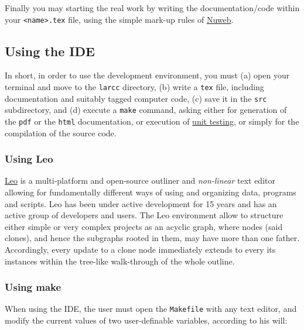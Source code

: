 Finally you may starting the real work by writing the documentation/code within your \texttt{<name>.tex} file, using the simple mark-up rules of \href{run:nuwebdoc.pdf}{Nuweb}.

\subsection{Using the IDE}

In short, in order to use the development environment, you must (a) open your terminal and move to the \texttt{larcc} directory, (b) write a \texttt{tex} file, including documentation and suitably tagged computer code, (c) save it in the \texttt{src} subdirectory, and (d)  execute a \texttt{make} command, asking either for generation of the \texttt{pdf} or the \texttt{html} documentation, or  execution of \href{http://en.wikipedia.org/wiki/Unit_testing}{unit testing}, or simply for the compilation of the source code.


\subsubsection{Using Leo}

\href{http://leoeditor.com}{Leo} is a multi-platform and open-source outliner and \emph{non-linear} text editor allowing for 
fundamentally different ways of using and organizing data, programs and scripts. 
Leo has been under active development for 15 years and has an active group of developers and users.
The Leo environment allow to structure either simple or very complex projects as an acyclic graph, where nodes (said clones), and hence the subgraphs rooted in them, may have more than one father.
Accordingly, every update to a clone node immediately extends to every its instances within the tree-like walk-through of the whole outline.


\subsubsection{Using make}

When using the IDE, the user must open the \texttt{Makefile} with any text editor, and modify the current values of two user-definable variables, according to his will:

